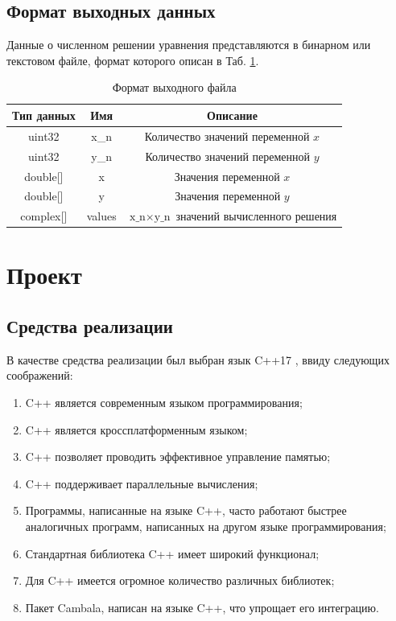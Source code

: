 \documentclass{fefu}
\begin{document}
        \subsection{Формат выходных данных}     
            \par Данные о численном решении уравнения представляются в бинарном или текстовом файле, формат которого описан в Таб. \ref{tbl::output}.
            \begin{table}[h]
                \centering
                \begin{tabular}{|c|c|c|}
                    \hline
                    Тип данных & Имя & Описание\\
                    \hline
                    \textsf{uint32} & x\_n & Количество значений переменной $x$\\
                    \hline
                    \textsf{uint32} & y\_n & Количество значений переменной $y$\\
                    \hline
                    \textsf{double[]} & x & Значения переменной $x$\\
                    \hline
                    \textsf{double[]} & y & Значения переменной $y$\\
                    \hline
                    \textsf{complex[]} & values & $\text{x\_n}\times\text{y\_n}$ значений вычисленного решения\\
                    \hline
                \end{tabular}
                \caption{\label{tbl::output}Формат выходного файла}
            \end{table}
    \section{Проект}
        \subsection{Средства реализации}
            \par В качестве средства реализации был выбран язык C++17 \cite{c++}, ввиду следующих соображений:
            \begin{enumerate}
                \item C++ является современным языком программирования;
                \item C++ является кроссплатформенным языком;
                \item C++ позволяет проводить эффективное управление памятью;
                \item C++ поддерживает параллельные вычисления;
                \item Программы, написанные на языке C++, часто работают быстрее аналогичных программ, написанных на другом языке программирования;
                \item Стандартная библиотека C++ имеет широкий функционал;
                \item Для C++ имеется огромное количество различных библиотек;
                \item Пакет Cambala, написан на языке C++, что упрощает его интеграцию.
            \end{enumerate}
\end{document}
